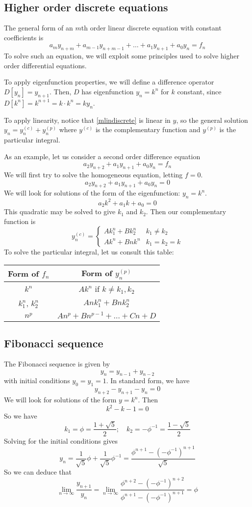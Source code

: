 \subsection{Higher order discrete equations}
The general form of an \(m\)th order linear discrete equation with constant coefficients is
\begin{equation}\label{mlindiscrete}
	a_m y_{n+m} + a_{m-1}y_{n+m-1} + \dots + a_1y_{n+1} + a_0y_n = f_n
\end{equation}
To solve such an equation, we will exploit some principles used to solve higher order differential equations.

To apply eigenfunction properties, we will define a difference operator \(D[y_n] = y_{n+1}\).
Then, \(D\) has eigenfunction \(y_n = k^n\) for \(k\) constant, since \(D[k^n] = k^{n+1} = k \cdot k^n = ky_n\).

To apply linearity, notice that \eqref{mlindiscrete} is linear in \(y\), so the general solution \(y_n = y_n^{(c)} + y_n^{(p)}\) where \(y^{(c)}\) is the complementary function and \(y^{(p)}\) is the particular integral.

As an example, let us consider a second order difference equation
\[
	a_2 y_{n+2} + a_1 y_{n+1} + a_0 y_n = f_n
\]
We will first try to solve the homogeneous equation, letting \(f=0\).
\[
	a_2 y_{n+2} + a_1 y_{n+1} + a_0 y_n = 0
\]
We will look for solutions of the form of the eigenfunction: \(y_n = k^n\).
\[
	a_2 k^2 + a_1 k + a_0 = 0
\]
This quadratic may be solved to give \(k_1\) and \(k_2\).
Then our complementary function is
\[
	y_n^{(c)} = \begin{cases}
		A k_1^n + B k_2^n & k_1 \neq k_2  \\
		A k^n + Bnk^n     & k_1 = k_2 = k
	\end{cases}
\]
To solve the particular integral, let us consult this table:

\begin{tabular}{cc}
	Form of \(f_n\)      & Form of \(y_n^{(p)}\)                \\\midrule
	\(k^n\)              & \(Ak^n\) if \(k \neq k_1, k_2\)      \\
	\(k_1^n\), \(k_2^n\) & \(Ank_1^n + Bnk_2^n\)                \\
	\(n^p\)              & \(An^p + Bn^{p-1} + \dots + Cn + D\)
\end{tabular}

\subsection{Fibonacci sequence}
The Fibonacci sequence is given by
\[
	y_n = y_{n-1} + y_{n-2}
\]
with initial conditions \(y_0 = y_1 = 1\).
In standard form, we have
\[
	y_{n+2} - y_{n+1} - y_n = 0
\]
We will look for solutions of the form \(y=k^n\).
Then
\[
	k^2 - k - 1 = 0
\]
So we have
\[
	k_1 = \phi = \frac{1 + \sqrt 5}{2};\quad k_2 = -\phi^{-1} = \frac{1 - \sqrt 5}{2}
\]
Solving for the initial conditions gives
\[
	y_n = \frac{1}{\sqrt 5}\phi + \frac{1}{\sqrt 5}\phi^{-1} = \frac{\phi^{n+1} - (-\phi^{-1})^{n+1}}{\sqrt{5}}
\]
So we can deduce that
\[
	\lim_{n \to \infty} \frac{y_{n+1}}{y_n} = \lim_{n \to \infty} \frac{\phi^{n+2} - (-\phi^{-1})^{n+2}}{\phi^{n+1} - (-\phi^{-1})^{n+1}} = \phi
\]

